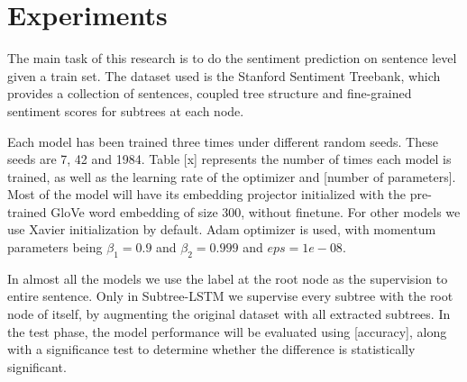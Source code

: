 \section{Experiments}
\label{sec: experiments}
The main task of this research is to do the sentiment prediction on sentence
level given a train set. The dataset used is the Stanford Sentiment
Treebank\cite{socher2013recursive}, which provides a collection of sentences,
coupled tree structure and fine-grained sentiment scores for subtrees at each
node.


Each model has been trained three times under different random seeds. These
seeds are 7, 42 and 1984. Table [x] represents the number of times each model is
trained, as well as the learning rate of the optimizer and [number of
parameters]. Most of the model will have its embedding projector initialized
with the pre-trained GloVe\cite{pennington2014glove} word embedding of size 300,
without finetune. For other models we use Xavier initialization by default. Adam
optimizer\cite{DBLP:journals/corr/KingmaB14} is used, with momentum parameters
being $\beta_{1}=0.9$ and $\beta_{2}=0.999$ and $eps=1e-08$.

In almost all the models we use the label at the root node as the supervision to
entire sentence. Only in Subtree-LSTM we supervise every subtree with the root
node of itself, by augmenting the original dataset with all extracted subtrees.
In the test phase, the model performance will be evaluated using [accuracy],
along with a significance test to determine whether the difference is
statistically significant.


